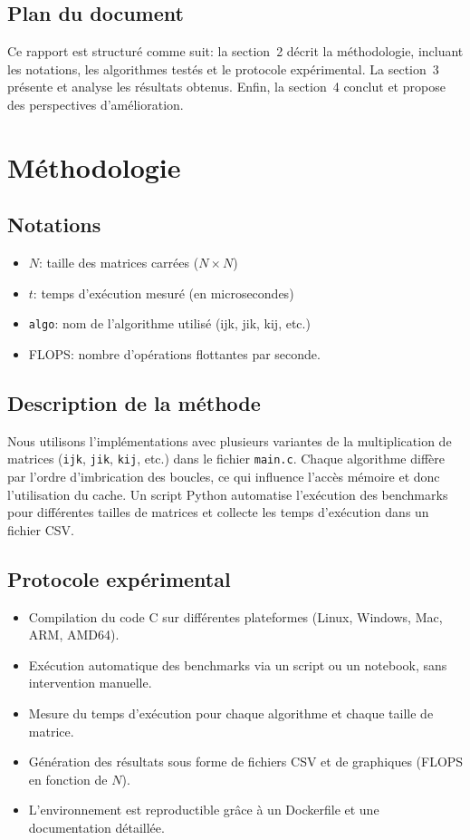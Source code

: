 \documentclass[a4paper,12pt]{article}
\begin{document}
\subsection*{Plan du document}
Ce rapport est structuré comme suit: la section~2 décrit la méthodologie, 
incluant les notations, les algorithmes testés et le protocole expérimental. 
La section~3 présente et analyse les résultats obtenus. 
Enfin, la section~4 conclut et propose des perspectives d'amélioration.

\section{Méthodologie}

\subsection*{Notations}
\begin{itemize}
    \item \(N\): taille des matrices carrées (\(N \times N\))
    \item \(t\): temps d'exécution mesuré (en microsecondes)
    \item \texttt{algo}: nom de l'algorithme utilisé (ijk, jik, kij, etc.)
    \item FLOPS: nombre d'opérations flottantes par seconde.
\end{itemize}

\subsection*{Description de la méthode}
Nous utilisons l'implémentations avec plusieurs variantes de la multiplication de matrices 
(\texttt{ijk}, \texttt{jik}, \texttt{kij}, etc.) dans le fichier \texttt{main.c}. 
Chaque algorithme diffère par l'ordre d'imbrication des boucles, 
ce qui influence l'accès mémoire et donc l'utilisation du cache. 
Un script Python automatise l'exécution des benchmarks pour différentes 
tailles de matrices et collecte les temps d'exécution dans un fichier CSV.

\subsection*{Protocole expérimental}
\begin{itemize}
    \item Compilation du code C sur différentes plateformes (Linux, Windows, Mac, ARM, AMD64).
    \item Exécution automatique des benchmarks via un script ou un notebook, sans intervention manuelle.
    \item Mesure du temps d'exécution pour chaque algorithme et chaque taille de matrice.
    \item Génération des résultats sous forme de fichiers CSV et de graphiques (FLOPS en fonction de \(N\)).
    \item L'environnement est reproductible grâce à un Dockerfile et une documentation détaillée.
\end{itemize}
\end{document}
